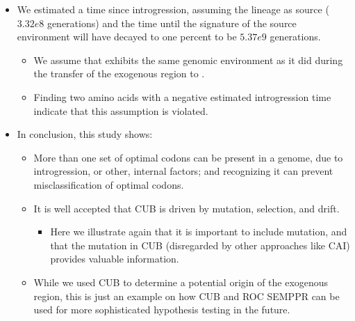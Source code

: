 \documentclass[12pt]{article}
\begin{document}
\begin{itemize}
	\item We estimated a time since introgression, assuming the \gossypii lineage as source ($3.32e8$ generations) and the time until the signature of the source environment will have decayed to one percent to be $5.37e9$ generations.
	\begin{itemize}
		\item We assume that \gossypii exhibits the same genomic environment as it did during the transfer of the exogenous region to \kluyveri.
		\item Finding two amino acids with a negative estimated introgression time indicate that this assumption is violated.
	\end{itemize}	
	\item In conclusion, this study shows:
	\begin{itemize}
		\item More than one set of optimal codons can be present in a genome, due to introgression, or other, internal factors; and recognizing it can prevent misclassification of optimal codons.
		\item It is well accepted that CUB is driven by mutation, selection, and drift.
		\begin{itemize}
			\item  Here we illustrate again that it is important to include mutation, and that the mutation in CUB (disregarded by other approaches like CAI) provides valuable information.
		\end{itemize}
		\item While we used CUB to determine a potential origin of the exogenous region, this is just an example on how CUB and ROC SEMPPR can be used for more sophisticated hypothesis testing in the future.
	\end{itemize}
\end{itemize}
\end{document}
